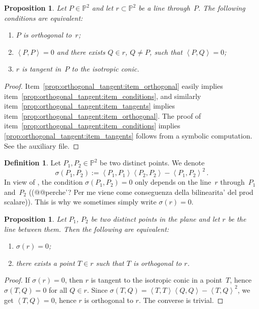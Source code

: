 \documentclass[12pt, a4paper, reqno, captions=tableheading,bibliography=totoc]{scrartcl}
\theoremstyle{plain}
\newtheorem{prop}[lemma]{Proposition}
\theoremstyle{definition}
\newtheorem{definition}[lemma]{Definition}
\newcommand{\p}{\mathbb{P}}
\newcommand{\scl}[2]{\left\langle {#1}, {#2} \right\rangle}
\begin{document}
\begin{prop}
\label{prop:orthogonal_tangent}
  Let $P \in \p^2$ and let $r \subset \p^2$ be a line through~$P$.
  The following conditions are equivalent:
  \begin{enumerate}
  \item \label{prop:orthogonal_tangent:item_orthogonal} $P$ is orthogonal to~$r$;
  \item \label{prop:orthogonal_tangent:item_conditions} $\scl{P}{P} = 0$ and there exists $Q \in r$, $Q \neq P$, such
    that $\scl{P}{Q} = 0$;
  \item \label{prop:orthogonal_tangent:item_tangents} $r$ is tangent in~$P$ to the isotropic conic.
  \end{enumerate}
\end{prop}
\begin{proof}
Item~\ref{prop:orthogonal_tangent:item_orthogonal} easily implies item~\ref{prop:orthogonal_tangent:item_conditions}, and similarly item~\ref{prop:orthogonal_tangent:item_tangents} implies item~\ref{prop:orthogonal_tangent:item_orthogonal}. The proof of item~\ref{prop:orthogonal_tangent:item_conditions} implies \ref{prop:orthogonal_tangent:item_tangents} follows from a symbolic computation. See the auxiliary file.
\end{proof}

\begin{definition}
\label{definition:condition_sigma}
 Let $P_1, P_2 \in \p^2$ be two distinct points.
 We denote
 \[
  \sigma(P_1, P_2) := \scl{P_1}{P_1} \scl{P_2}{P_2} - \scl{P_1}{P_2}^2 \,.
 \]
 In view of , the condition $\sigma(P_1, P_2) = 0$ only depends on the line~$r$ through~$P_1$ and~$P_2$ ((@@perche'? Per me
viene come conseguenza della bilinearita' del prod scalare)).
 This is why we sometimes simply write $\sigma(r) = 0$.
\end{definition}

\begin{prop}
  Let $P_1$, $P_2$ be two distinct points in the plane and let $r$ be the line between them.
  Then the following are equivalent:
  \begin{enumerate}
  \item $\sigma(r) = 0$;
  \item there exists a point $T \in r$ such that $T$ is orthogonal to $r$.
  \end{enumerate}
\end{prop}
\begin{proof}
  If $\sigma(r) = 0$, then $r$ is tangent to the isotropic conic in a
  point~$T$, hence $\sigma(T, Q) = 0$ for all $Q \in r$.
  Since  $\sigma(T, Q) = \scl{T}{T}\scl{Q}{Q}-\scl{T}{Q}^2$, we get
  $\scl{T}{Q} = 0$, hence $r$ is orthogonal to $r$.
  The converse is trivial.
\end{proof}
\end{document}

